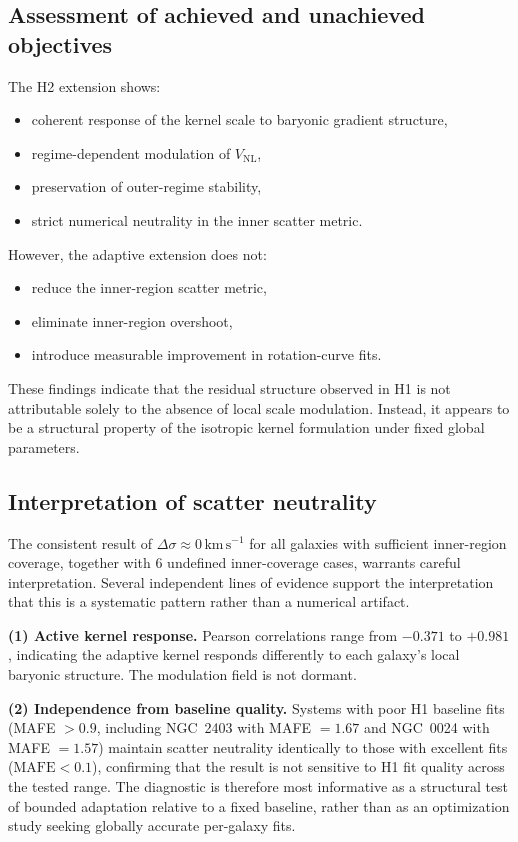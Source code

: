 \documentclass[twocolumn,linenumbers]{aastex701}
\begin{document}
\subsection{Assessment of achieved and unachieved objectives}

The H2 extension shows:
\begin{itemize}
	\item coherent response of the kernel scale to baryonic gradient structure,
	\item regime-dependent modulation of $V_{\mathrm{NL}}$,
	\item preservation of outer-regime stability,
	\item strict numerical neutrality in the inner scatter metric.
\end{itemize}

However, the adaptive extension does not:
\begin{itemize}
	\item reduce the inner-region scatter metric,
	\item eliminate inner-region overshoot,
	\item introduce measurable improvement in rotation-curve fits.
\end{itemize}

These findings indicate that the residual structure observed in H1 is not
attributable solely to the absence of local scale modulation. Instead, it
appears to be a structural property of the isotropic kernel formulation
under fixed global parameters.

\subsection{Interpretation of scatter neutrality}

The consistent result of $\Delta\sigma \approx 0\,\mathrm{km\,s^{-1}}$
for all galaxies with sufficient inner-region coverage, together with
6 undefined inner-coverage cases, warrants careful interpretation.
Several independent lines of evidence support the interpretation that this
is a systematic pattern rather than a numerical artifact.

\textbf{(1) Active kernel response.} Pearson correlations range from
$-0.371$ to $+0.981$, indicating the adaptive kernel responds
differently to each galaxy's local baryonic structure. The modulation
field is not dormant.

\textbf{(2) Independence from baseline quality.} Systems with poor H1
baseline fits (MAFE $> 0.9$, including NGC~2403 with MAFE $= 1.67$ and
NGC~0024 with MAFE $= 1.57$) maintain scatter neutrality identically to
those with excellent fits ($\mathrm{MAFE} < 0.1$), confirming that the
result is not sensitive to H1 fit quality across the tested range. The
diagnostic is therefore most informative as a structural test of bounded
adaptation relative to a fixed baseline, rather than as an optimization
study seeking globally accurate per-galaxy fits.
\end{document}
